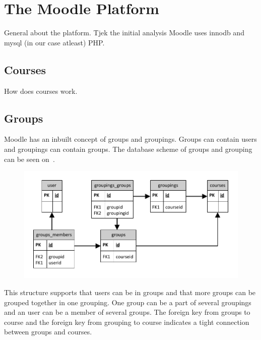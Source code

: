 
\section{The Moodle Platform}
\label{sec:moodleplatform}
	General about the platform. Tjek the initial analysis
Moodle uses innodb and mysql (in our case atleast) 
PHP.



\subsection{Courses}
	How does courses work.






\subsection{Groups}
Moodle has an inbuilt concept of groups and groupings. 
Groups can contain users and groupings can contain groups. 
The database scheme of groups and grouping can be seen on~.

\begin{figure}
	\centering
		\includegraphics[width=\textwidth]{images/moodlegroups}
	\label{fig:moodlegroupsandgroupings}
\end{figure}

This structure supports that users can be in groups and that more groups can be grouped together in one grouping. 
One group can be a part of several groupings and an user can be a member of several groups. 
The foreign key from groups to course and the foreign key from grouping to course indicates a tight connection between groups and courses. 

